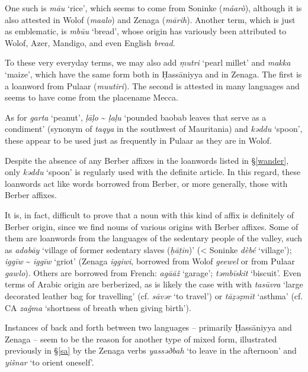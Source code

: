 \documentclass[output=paper]{langsci/langscibook}
\begin{document}
One such is \textit{mā{\R}u} ‘rice’, which seems to come from Soninke (\textit{máarò}), although it is also attested in Wolof (\textit{maalo}) and Zenaga (\textit{mārih}). Another term, which is just as emblematic, is \textit{mbū{\R}u} ‘bread’, whose origin has variously been attributed to Wolof, Azer, Mandigo, and even English \textit{bread}.

To these very everyday terms, we may also add \textit{ṃutri} ‘pearl millet’ and \textit{makka} ‘maize’, which have the same form both in Ḥassāniyya and in Zenaga. The first is a loanword from Pulaar (\textit{muutiri}). The second is attested in many languages and seems to have come from the placename Mecca. 

As for \textit{garta} ‘peanut’, \textit{ḷāḷo} \~{} \textit{ḷaḷu} ‘pounded baobab leaves that serve as a condiment’ (synonym of \textit{taqya} in the southwest of Mauritania) and \textit{kəddu} ‘spoon’, these appear to be used just as frequently in Pulaar as they are in Wolof. 


Despite the absence of any Berber affixes in the loanwords listed in §\ref{wander}, only \textit{kəddu} ‘spoon’ is regularly used with the definite article. In this regard, these loanwords act like words borrowed from Berber, or more generally, those with Berber affixes. 

It is, in fact, difficult to prove that a noun with this kind of affix is definitely of Berber origin, since we find nouns of various origins with Berber affixes. Some of them are loanwords from the languages of the sedentary people of the valley, such as \textit{adabāy} ‘village of former sedentary slaves (\textit{ḥ{\R}āṭīn})’ (< Soninke \textit{dèbé} ‘village’); \textit{iggīw} \~{} \textit{īggīw} ‘griot’ (Zenaga \textit{iggiwi}, borrowed from Wolof \textit{geewel} or from Pulaar \textit{gawlo}). Others are borrowed from French: \textit{agā{\R}āž} ‘garage’; \textit{təmbīskit} ‘biscuit’. Even terms of Arabic origin are berberized, as is likely the case with with \textit{tasūvra} ‘large decorated leather bag for travelling’ (cf. \textit{sāvər} ‘to travel’) or \textit{tāẓəẓmīt} ‘asthma’ (cf. CA \textit{zaǧma} ‘shortness of breath when giving birth’).


Instances of back and forth between two languages – primarily Ḥassāniyya and Zenaga – seem to be the reason for another type of mixed form, illustrated previously in §\ref{sa} by the Zenaga verbs \textit{yassəðbah} ‘to leave in the afternoon’ and \textit{yišnar} ‘to orient oneself’.
\end{document}
